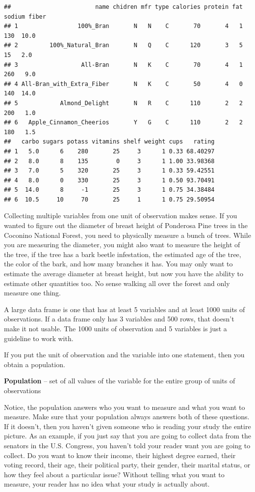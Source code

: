 \documentclass[
]{book}
\begin{document}
\begin{verbatim}
##                        name chidren mfr type calories protein fat sodium fiber
## 1                 100%_Bran       N   N    C       70       4   1    130  10.0
## 2         100%_Natural_Bran       N   Q    C      120       3   5     15   2.0
## 3                  All-Bran       N   K    C       70       4   1    260   9.0
## 4 All-Bran_with_Extra_Fiber       N   K    C       50       4   0    140  14.0
## 5            Almond_Delight       N   R    C      110       2   2    200   1.0
## 6   Apple_Cinnamon_Cheerios       Y   G    C      110       2   2    180   1.5
##   carbo sugars potass vitamins shelf weight cups   rating
## 1   5.0      6    280       25     3      1 0.33 68.40297
## 2   8.0      8    135        0     3      1 1.00 33.98368
## 3   7.0      5    320       25     3      1 0.33 59.42551
## 4   8.0      0    330       25     3      1 0.50 93.70491
## 5  14.0      8     -1       25     3      1 0.75 34.38484
## 6  10.5     10     70       25     1      1 0.75 29.50954
\end{verbatim}

Collecting multiple variables from one unit of observation makes sense. If you wanted to figure out the diameter of breast height of Ponderosa Pine trees in the Coconino National Forest, you need to physically measure a bunch of trees. While you are measuring the diameter, you might also want to measure the height of the tree, if the tree has a bark beetle infestation, the estimated age of the tree, the color of the bark, and how many branches it has. You may only want to estimate the average diameter at breast height, but now you have the ability to estimate other quantities too. No sense walking all over the forest and only measure one thing.

A large data frame is one that has at least 5 variables and at least 1000 units of observations. If a data frame only has 3 variables and 500 rows, that doesn't make it not usable. The 1000 units of observation and 5 variables is just a guideline to work with.

If you put the unit of observation and the variable into one statement, then you obtain a population.

\textbf{Population} -- set of all values of the variable for the entire group of units of observations

Notice, the population answers who you want to measure and what you want to measure. Make sure that your population always answers both of these questions. If it doesn't, then you haven't given someone who is reading your study the entire picture. As an example, if you just say that you are going to collect data from the senators in the U.S. Congress, you haven't told your reader want you are going to collect. Do you want to know their income, their highest degree earned, their voting record, their age, their political party, their gender, their marital status, or how they feel about a particular issue? Without telling what you want to measure, your reader has no idea what your study is actually about.
\end{document}
